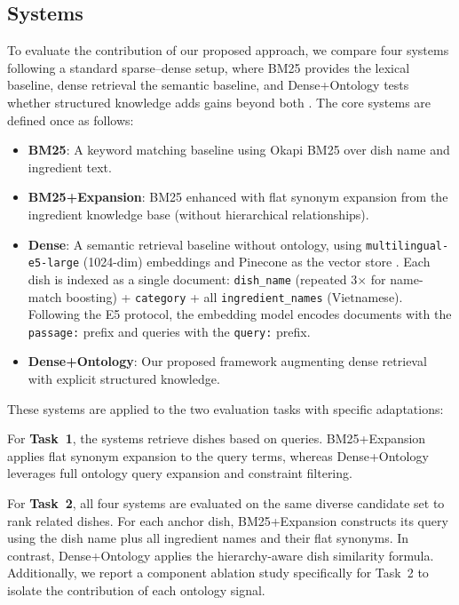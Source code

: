 \subsection{Systems}

To evaluate the contribution of our proposed approach, we compare four systems following a standard sparse--dense setup, where BM25 provides the lexical baseline, dense retrieval the semantic baseline, and Dense+Ontology tests whether structured knowledge adds gains beyond both \cite{robertson2009probabilistic, karpukhin2020dense, thakur2021beir}. The core systems are defined once as follows:

\begin{itemize}
  \item \textbf{BM25}: A keyword matching baseline using Okapi BM25 over dish name and ingredient text.
  \item \textbf{BM25+Expansion}: BM25 enhanced with flat synonym expansion from the ingredient knowledge base (without hierarchical relationships).
  \item \textbf{Dense}: A semantic retrieval baseline without ontology, using \texttt{multilingual-e5-large} (1024-dim) embeddings and Pinecone as the vector store \cite{wang2024multilinguale5}. Each dish is indexed as a single document: \texttt{dish\_name} (repeated 3$\times$ for name-match boosting) + \texttt{category} + all \texttt{ingredient\_names} (Vietnamese). Following the E5 protocol, the embedding model encodes documents with the \texttt{passage:} prefix and queries with the \texttt{query:} prefix.
  \item \textbf{Dense+Ontology}: Our proposed framework augmenting dense retrieval with explicit structured knowledge.
\end{itemize}

These systems are applied to the two evaluation tasks with specific adaptations:

For \textbf{Task~1}, the systems retrieve dishes based on queries. BM25+Expansion applies flat synonym expansion to the query terms, whereas Dense+Ontology leverages full ontology query expansion and constraint filtering.

For \textbf{Task~2}, all four systems are evaluated on the same diverse candidate set to rank related dishes. For each anchor dish, BM25+Expansion constructs its query using the dish name plus all ingredient names and their flat synonyms. In contrast, Dense+Ontology applies the hierarchy-aware dish similarity formula. Additionally, we report a component ablation study specifically for Task~2 to isolate the contribution of each ontology signal.

